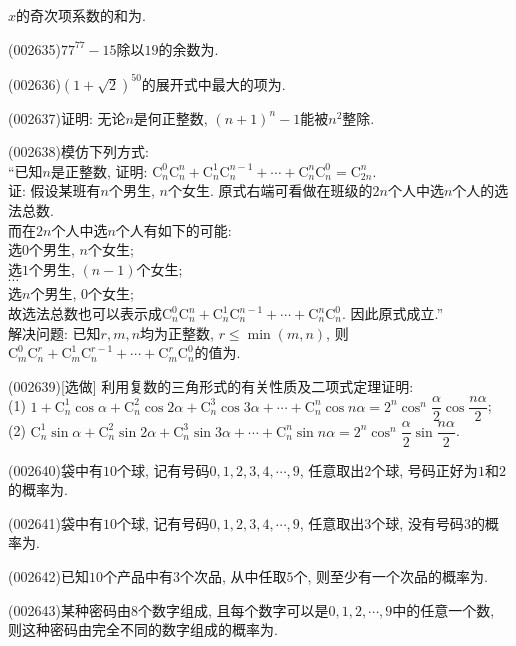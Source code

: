 $x$的奇次项系数的和为.
\item (002635)$77^{77}-15$除以$19$的余数为.
\item (002636)$\left(1+\sqrt{2}\right)^{50}$的展开式中最大的项为.
\item (002637)证明: 无论$n$是何正整数, $(n+1)^n-1$能被$n^2$整除.
\item (002638)模仿下列方式:\\ 
``已知$n$是正整数, 证明: $\mathrm{C}_n^0\mathrm{C}_n^n+\mathrm{C}_n^1\mathrm{C}_n^{n-1}+\cdots+\mathrm{C}_n^n\mathrm{C}_n^0=\mathrm{C}_{2n}^n$.\\ 
证: 假设某班有$n$个男生, $n$个女生. 原式右端可看做在班级的$2n$个人中选$n$个人的选法总数.\\ 
而在$2n$个人中选$n$个人有如下的可能:\\ 
选$0$个男生, $n$个女生;\\ 
选$1$个男生, $(n-1)$个女生;\\ 
$\cdots$\\ 
选$n$个男生, $0$个女生;\\ 
故选法总数也可以表示成$\mathrm{C}_n^0\mathrm{C}_n^n+\mathrm{C}_n^1\mathrm{C}_n^{n-1}+\cdots+\mathrm{C}_n^n\mathrm{C}_n^0$. 因此原式成立.''\\ 
解决问题: 已知$r,m,n$均为正整数, $r\le \min(m,n)$, 则$\mathrm{C}_m^0\mathrm{C}_n^r+\mathrm{C}_m^1\mathrm{C}_n^{r-1}+\cdots+\mathrm{C}_m^r\mathrm{C}_n^0$的值为.
\item (002639)[选做]
利用复数的三角形式的有关性质及二项式定理证明:\\ 
(1) $1+\mathrm{C}_n^1\cos\alpha+\mathrm{C}_n^2\cos 2\alpha+\mathrm{C}_n^3\cos 3\alpha+\cdots+\mathrm{C}_n^n\cos n\alpha=2^n\cos^n\dfrac{\alpha}{2}\cos\dfrac{n\alpha}{2}$;\\ 
(2) $\mathrm{C}_n^1\sin\alpha+\mathrm{C}_n^2\sin 2\alpha+\mathrm{C}_n^3\sin 3\alpha+\cdots+\mathrm{C}_n^n\sin n\alpha=2^n\cos^n\dfrac{\alpha}{2}\sin\dfrac{n\alpha}{2}$.
\item (002640)袋中有$10$个球, 记有号码$0,1,2,3,4,\cdots,9$, 任意取出$2$个球, 号码正好为$1$和$2$的概率为.
\item (002641)袋中有$10$个球, 记有号码$0,1,2,3,4,\cdots,9$, 任意取出$3$个球, 没有号码$3$的概率为.
\item (002642)已知$10$个产品中有$3$个次品, 从中任取$5$个, 则至少有一个次品的概率为.
\item (002643)某种密码由$8$个数字组成, 且每个数字可以是$0,1,2,\cdots,9$中的任意一个数, 则这种密码由完全不同的数字组成的概率为.
